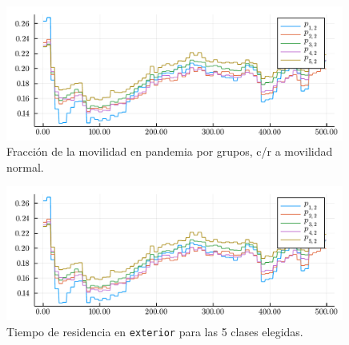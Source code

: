 \begin{figure}[!h]
\centering
\includegraphics[width=0.99\textwidth]{img/resultados/tiempos-exterior.pdf}
\caption{Fracción de la movilidad en pandemia por grupos, c/r a movilidad normal.}
\label{img:mov-pandemia}
\end{figure}

\begin{figure}[!h]
\centering
\includegraphics[width=0.99\textwidth]{img/resultados/tiempos-exterior.pdf}
\caption[Tiempo de residencia en \texttt{exterior} para las 5 clases elegidas.]{Tiempo de residencia en \texttt{exterior} para las 5 clases elegidas.}
\label{img:Pmatrix-pandemia-exterior}
\end{figure}